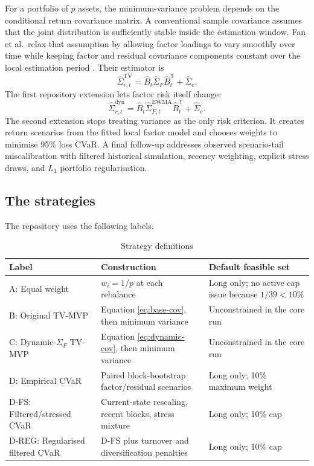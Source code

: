 \documentclass[11pt,a4paper]{article}
\newcommand{\wh}{\widehat}
\newcommand{\trans}{^{\mathsf T}}
\begin{document}
For a portfolio of $p$ assets, the minimum-variance problem depends on the conditional return covariance matrix. A conventional sample covariance assumes that the joint distribution is sufficiently stable inside the estimation window. Fan et al.\ relax that assumption by allowing factor loadings to vary smoothly over time while keeping factor and residual covariance components constant over the local estimation period \cite{fan2024}. Their estimator is
\begin{equation}
  \wh\Sigma_{r,t}^{\text{{TV}}}
  = \wh B_t\wh\Sigma_F\wh B_t\trans + \wh\Sigma_e.
  \label{eq:base-cov}
\end{equation}
The first repository extension lets factor risk itself change:
\begin{equation}
  \wh\Sigma_{r,t}^{\text{{dyn}}}
  = \wh B_t\wh\Sigma_{F,t}^{\text{{EWMA}}}\wh B_t\trans + \wh\Sigma_e.
  \label{eq:dynamic-cov}
\end{equation}
The second extension stops treating variance as the only risk criterion. It creates return scenarios from the fitted local factor model and chooses weights to minimise 95\% loss CVaR. A final follow-up addresses observed scenario-tail miscalibration with filtered historical simulation, recency weighting, explicit stress draws, and $L_1$ portfolio regularisation.

\subsection{The strategies}

The repository uses the following labels.

\begin{table}[H]
\centering
\caption{Strategy definitions}
\label{tab:strategies}
\small
\begin{tabularx}{\textwidth}{@{}L{0.20\textwidth}YL{0.25\textwidth}@{}}
\toprule
Label & Construction & Default feasible set \\
\midrule
A: Equal weight & $w_i=1/p$ at each rebalance & Long only; no active cap issue because $1/39<10\%$ \\
B: Original TV-MVP & Equation \eqref{eq:base-cov}, then minimum variance & Unconstrained in the core run \\
C: Dynamic-$\Sigma_F$ TV-MVP & Equation \eqref{eq:dynamic-cov}, then minimum variance & Unconstrained in the core run \\
D: Empirical CVaR & Paired block-bootstrap factor/residual scenarios & Long only; 10\% maximum weight \\
D-FS: Filtered/stressed CVaR & Current-state rescaling, recent blocks, stress mixture & Long only; 10\% cap \\
D-REG: Regularised filtered CVaR & D-FS plus turnover and diversification penalties & Long only; 10\% cap \\
\bottomrule
\end{tabularx}
\end{table}
\end{document}

